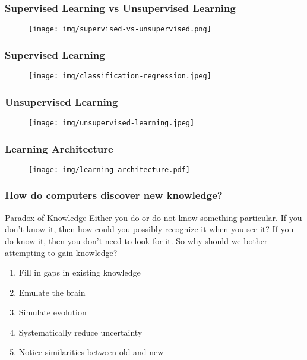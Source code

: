 \documentclass[UTF8,11pt,colorlinks,compress,openany]{beamer}%
\begin{document}
\begin{frame}\frametitle{Supervised Learning vs Unsupervised Learning}
\begin{figure}[H]
\texttt{[image: img/supervised-vs-unsupervised.png]}
\end{figure}
\end{frame}

\begin{frame}\frametitle{Supervised Learning}
\begin{figure}[H]
\texttt{[image: img/classification-regression.jpeg]}	
\end{figure}
\end{frame}

\begin{frame}\frametitle{Unsupervised Learning}
\begin{figure}[H]
\texttt{[image: img/unsupervised-learning.jpeg]}	
\end{figure}
\end{frame}

\begin{frame}\frametitle{Learning Architecture}
\begin{figure}[H]
	\texttt{[image: img/learning-architecture.pdf]}
\end{figure}
\end{frame}

\begin{frame}\frametitle{How do computers discover new knowledge?}
\begin{block}{Paradox of Knowledge}
Either you do or do not know something particular. If you don't know it, then how could you possibly recognize it when you see it? If you do know it, then you don't need to look for it. So why should we bother attempting to gain knowledge?
\end{block}
\begin{enumerate}
	\item Fill in gaps in existing knowledge
	\item Emulate the brain
	\item Simulate evolution
	\item Systematically reduce uncertainty
	\item Notice similarities between old and new
\end{enumerate}
\end{frame}
\end{document}
